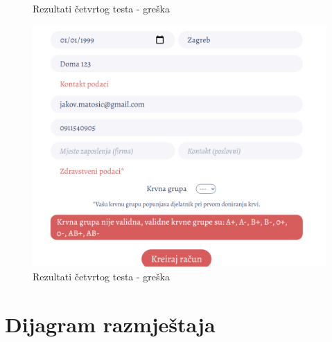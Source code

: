 \begin{itemize}
\begin{figure}[H]
        			\centering
        			\caption{Rezultati četvrtog testa - greška}
        			\label{fig:controller}
        		\end{figure}
        		\begin{figure}[H]
                    \includegraphics[scale=0.4]{slike/Tests/sistem5.png}
        			\centering
        			\caption{Rezultati četvrtog testa - greška}
        			\label{fig:controller}
        		\end{figure}
			\end{itemize}
			
			
			\eject 
		
		
		\section{Dijagram razmještaja}
			
			
			 
